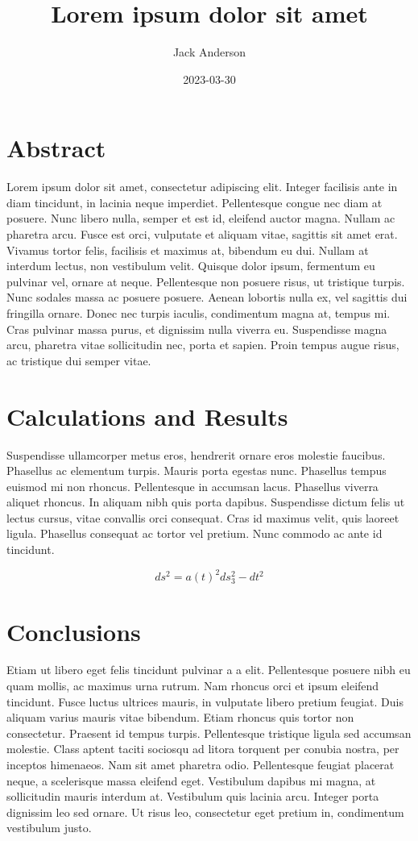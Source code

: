 \documentclass{uestcphyrpt}
\title{Lorem ipsum dolor sit amet}
\author{Jack Anderson}
\date{2023-03-30}
\begin{document}
\maketitle

\section{Abstract}

Lorem ipsum dolor sit amet, consectetur adipiscing elit. Integer facilisis ante in diam tincidunt, in lacinia neque imperdiet. Pellentesque congue nec diam at posuere. Nunc libero nulla, semper et est id, eleifend auctor magna. Nullam ac pharetra arcu. Fusce est orci, vulputate et aliquam vitae, sagittis sit amet erat. Vivamus tortor felis, facilisis et maximus at, bibendum eu dui. Nullam at interdum lectus, non vestibulum velit. Quisque dolor ipsum, fermentum eu pulvinar vel, ornare at neque. Pellentesque non posuere risus, ut tristique turpis. Nunc sodales massa ac posuere posuere. Aenean lobortis nulla ex, vel sagittis dui fringilla ornare. Donec nec turpis iaculis, condimentum magna at, tempus mi. Cras pulvinar massa purus, et dignissim nulla viverra eu. Suspendisse magna arcu, pharetra vitae sollicitudin nec, porta et sapien. Proin tempus augue risus, ac tristique dui semper vitae.


\section{Calculations and Results}

Suspendisse ullamcorper metus eros, hendrerit ornare eros molestie faucibus. Phasellus ac elementum turpis. Mauris porta egestas nunc. Phasellus tempus euismod mi non rhoncus. Pellentesque in accumsan lacus. Phasellus viverra aliquet rhoncus. In aliquam nibh quis porta dapibus. Suspendisse dictum felis ut lectus cursus, vitae convallis orci consequat. Cras id maximus velit, quis laoreet ligula. Phasellus consequat ac tortor vel pretium. Nunc commodo ac ante id tincidunt.

\[ ds^2=a(t)^2ds_3^2-dt^2 \]

\section{Conclusions}

Etiam ut libero eget felis tincidunt pulvinar a a elit. Pellentesque posuere nibh eu quam mollis, ac maximus urna rutrum. Nam rhoncus orci et ipsum eleifend tincidunt. Fusce luctus ultrices mauris, in vulputate libero pretium feugiat. Duis aliquam varius mauris vitae bibendum. Etiam rhoncus quis tortor non consectetur. Praesent id tempus turpis. Pellentesque tristique ligula sed accumsan molestie. Class aptent taciti sociosqu ad litora torquent per conubia nostra, per inceptos himenaeos. Nam sit amet pharetra odio. Pellentesque feugiat placerat neque, a scelerisque massa eleifend eget. Vestibulum dapibus mi magna, at sollicitudin mauris interdum at. Vestibulum quis lacinia arcu. Integer porta dignissim leo sed ornare. Ut risus leo, consectetur eget pretium in, condimentum vestibulum justo.
\end{document}

